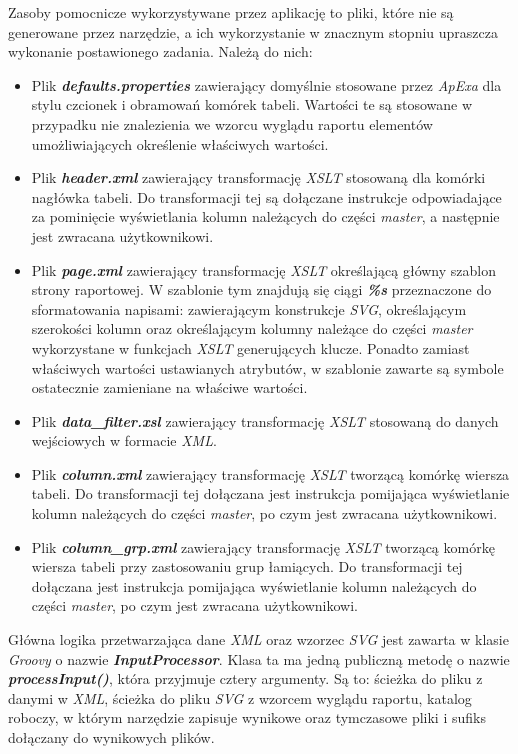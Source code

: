 \documentclass[11pt,a4paper]{article}
\begin{document}
Zasoby pomocnicze wykorzystywane przez aplikację to pliki, które nie są generowane przez narzędzie, a ich wykorzystanie w znacznym stopniu upraszcza wykonanie postawionego zadania. Należą do nich:
\begin{itemize}
	\item Plik \emph{\textbf{defaults.properties}} zawierający domyślnie stosowane przez \emph{ApExa} dla stylu czcionek i obramowań komórek tabeli. Wartości te są stosowane w przypadku nie znalezienia we wzorcu wyglądu raportu elementów umożliwiających określenie właściwych wartości. 
	\item Plik \emph{\textbf{header.xml}} zawierający transformację \emph{XSLT} stosowaną dla komórki nagłówka tabeli. Do transformacji tej są dołączane instrukcje odpowiadające za pominięcie wyświetlania kolumn należących do części \emph{master}, a następnie jest zwracana użytkownikowi.
	\item Plik \emph{\textbf{page.xml}} zawierający transformację \emph{XSLT} określającą główny szablon strony raportowej. W szablonie tym znajdują się ciągi \emph{\textbf{\%s}} przeznaczone do sformatowania napisami: zawierającym konstrukcje \emph{SVG}, określającym szerokości kolumn oraz określającym kolumny należące do części \emph{master} wykorzystane w funkcjach \emph{XSLT} generujących klucze. Ponadto zamiast właściwych wartości ustawianych atrybutów, w szablonie zawarte są symbole ostatecznie zamieniane na właściwe wartości.
	\item Plik \emph{\textbf{data\_filter.xsl}} zawierający transformację \emph{XSLT} stosowaną do danych wejściowych w formacie \emph{XML}.
	\item Plik \emph{\textbf{column.xml}} zawierający transformację \emph{XSLT} tworzącą komórkę wiersza tabeli. Do transformacji tej dołączana jest instrukcja pomijająca wyświetlanie kolumn należących do części \emph{master}, po czym jest zwracana użytkownikowi.
	\item Plik \emph{\textbf{column\_grp.xml}} zawierający transformację \emph{XSLT} tworzącą komórkę wiersza tabeli przy zastosowaniu grup łamiących. Do transformacji tej dołączana jest instrukcja pomijająca wyświetlanie kolumn należących do części \emph{master}, po czym jest zwracana użytkownikowi.
\end{itemize}

Główna logika przetwarzająca dane \emph{XML} oraz wzorzec \emph{SVG} jest zawarta w klasie \emph{Groovy} o nazwie \emph{\textbf{InputProcessor}}. Klasa ta ma jedną publiczną metodę o nazwie \emph{\textbf{processInput()}}, która przyjmuje cztery argumenty. Są to: ścieżka do pliku z danymi w \emph{XML}, ścieżka do pliku \emph{SVG} z wzorcem wyglądu raportu, katalog roboczy, w którym narzędzie zapisuje wynikowe oraz tymczasowe pliki i sufiks dołączany do wynikowych plików.
\end{document}
